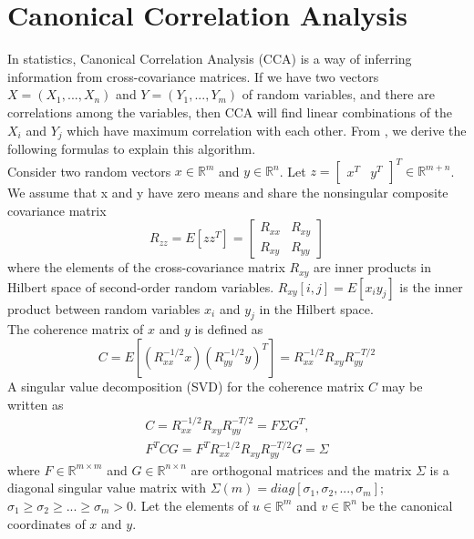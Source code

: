 \documentclass[12pt]{report} %
\begin{document}
\section{Canonical Correlation Analysis}
In statistics, Canonical Correlation Analysis (CCA) is a way of inferring information from cross-covariance matrices. If we have two vectors \(X = (X_{1}, ..., X_{n})\) and \(Y = (Y_{1}, ..., Y_{m})\) of random variables, and there are correlations among the variables, then CCA will find linear combinations of the $X_{i}$ and $Y_{j}$ which have maximum correlation with each other\cite{CCA}. From \cite{ECCA}, we derive the following formulas to explain this algorithm.\\
Consider two random vectors $x\in \mathbb{R}^{m}$ and $y\in \mathbb{R}^{n}$. Let $z= \begin{bmatrix}x^T & y^T\end{bmatrix}^T \in \mathbb{R}^{m+n}$. We assume that x and y have zero means and share the nonsingular composite covariance matrix
\begin{equation}
R_{zz}=E[zz^T]=\begin{bmatrix}
R_{xx} & R_{xy} \\
R_{xy} & R_{yy}
\end{bmatrix}
\end{equation}
where the elements of the cross-covariance matrix $R_{xy}$ are inner products in Hilbert space of second-order random variables. $R_{xy}[i,j]=E[x_{i}y_{j}]$ is the inner product between random variables $x_{i}$ and $y_{j}$ in the Hilbert space. \\
The coherence matrix of $x$ and $y$ is defined as
\begin{equation}
C=E[(R_{xx}^{-1/2}x)(R_{yy}^{-1/2}y)^T]=R_{xx}^{-1/2}R_{xy}R_{yy}^{-T/2}
\end{equation}
A singular value decomposition (SVD) for the coherence matrix $C$ may be written as
\begin{equation}
\begin{split}
C=R_{xx}^{-1/2}R_{xy}R_{yy}^{-T/2}=F\Sigma G^T, \\ F^TCG=F^TR_{xx}^{-1/2}R_{xy}R_{yy}^{-T/2}G=\Sigma
\end{split}
\end{equation}
where $F\in \mathbb{R}^{m\times m}$ and $G\in \mathbb{R}^{n\times n}$ are orthogonal matrices and the matrix $\Sigma$ is a diagonal singular value matrix with $\Sigma(m)=diag[\sigma_{1},\sigma_{2},...,\sigma_{m}]$; $\sigma_{1}\geq\sigma_{2}\geq...\geq\sigma_{m}>0$. Let the elements of $u\in \mathbb{R}^{m}$ and $v\in \mathbb{R}^{n}$ be the canonical coordinates of $x$ and $y$. \\
\end{document}
